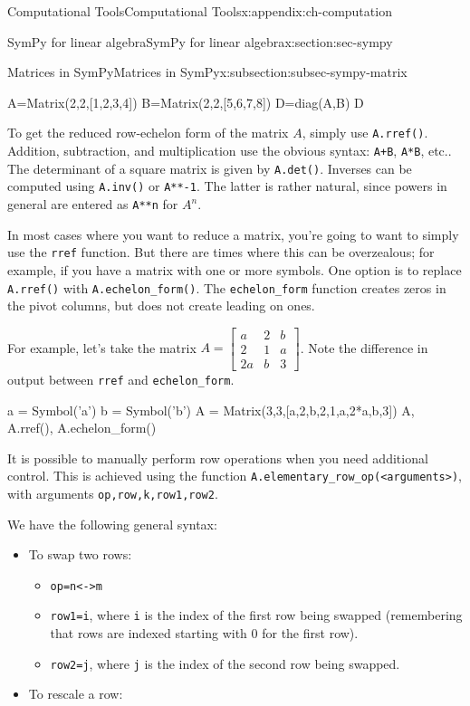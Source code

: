 \documentclass[oneside,10pt,]{book}
\newcommand{\mono}[1]{\texttt{#1}}
\numberwithin{equation}{section}
\newcommand{\bbm}{\begin{bmatrix}}
\newcommand{\ebm}{\end{bmatrix}}
\newcommand{\amp}{&}
\begin{document}
\begin{appendixptx}{Computational Tools}{}{Computational Tools}{}{}{x:appendix:ch-computation}
\begin{sectionptx}{SymPy for linear algebra}{}{SymPy for linear algebra}{}{}{x:section:sec-sympy}
\begin{subsectionptx}{Matrices in SymPy}{}{Matrices in SymPy}{}{}{x:subsection:subsec-sympy-matrix}
\begin{sageinput}
A=Matrix(2,2,[1,2,3,4])
B=Matrix(2,2,[5,6,7,8])
D=diag(A,B)
D
\end{sageinput}
To get the reduced row-echelon form of the matrix \(A\), simply use \mono{A.rref()}. Addition, subtraction, and multiplication use the obvious syntax: \mono{A+B}, \mono{A*B}, etc.\@. The determinant of a square matrix is given by \mono{A.det()}. Inverses can be computed using \mono{A.inv()} or \mono{A**-1}. The latter is rather natural, since powers in general are entered as \mono{A**n} for \(A^n\).%
\par
In most cases where you want to reduce a matrix, you're going to want to simply use the \mono{rref} function. But there are times where this can be overzealous; for example, if you have a matrix with one or more symbols. One option is to replace \mono{A.rref()} with \mono{A.echelon\_form()}. The \mono{echelon\_form} function creates zeros in the pivot columns, but does not create leading on ones.%
\par
For example, let's take the matrix \(A = \bbm a \amp 2\amp b\\2\amp 1\amp a\\2a\amp b\amp 3\ebm\). Note the difference in output between \mono{rref} and \mono{echelon\_form}.%
\begin{sageinput}
a = Symbol('a')
b = Symbol('b')
A = Matrix(3,3,[a,2,b,2,1,a,2*a,b,3])
A, A.rref(), A.echelon_form()
\end{sageinput}
It is possible to manually perform row operations when you need additional control. This is achieved using the function \mono{A.elementary\_row\_op(<arguments>)}, with arguments \mono{op,row,k,row1,row2}.%
\par
We have the following general syntax:%
\begin{itemize}[label=\textbullet]
\item{}To swap two rows:%
\begin{itemize}[label=$\circ$]
\item{}\mono{op=\textquotesingle{}n<->m\textquotesingle{}}%
\item{}\mono{row1=i}, where \mono{i} is the index of the first row being swapped (remembering that rows are indexed starting with \(0\) for the first row).%
\item{}\mono{row2=j}, where \mono{j} is the index of the second row being swapped.%
\end{itemize}
%
\item{}To rescale a row:%
\begin{itemize}[label=$\circ$]

\end{itemize}
\end{itemize}
\end{subsectionptx}
\end{sectionptx}
\end{appendixptx}
\end{document}
